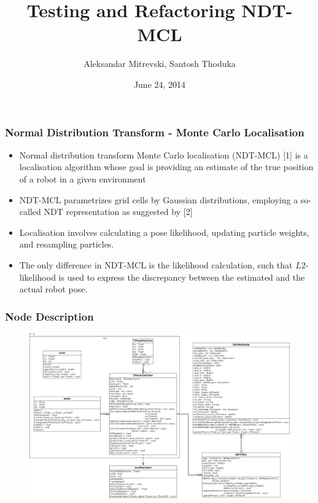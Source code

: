 \documentclass{beamer}
\title[Testing and Refactoring NDT-MCL]{Testing and Refactoring NDT-MCL} %
\author{Aleksandar Mitrevski, Santosh Thoduka} %
\institute[BRSU] %
{
Hochschule Bonn Rhein Sieg \\ %
\medskip
\textit{aleksandar.mitrevski@smail.inf.h-brs.de\\santosh.thoduka@smail.inf.h-brs.de} 
}
\date{June 24, 2014} %
\newenvironment{changemargin}[2]{%
  \begin{list}{}{%
    \setlength{\topsep}{0pt}%
    \setlength{\leftmargin}{#1}%
    \setlength{\rightmargin}{#2}%
    \setlength{\listparindent}{\parindent}%
    \setlength{\itemindent}{\parindent}%
    \setlength{\parsep}{\parskip}%
  }%
  \item[]}{\end{list}}
\begin{document}

\begin{frame}
\titlepage %
\end{frame}


\begin{frame}
\frametitle{Normal Distribution Transform - Monte Carlo Localisation}
\begin{itemize}
\item Normal distribution transform Monte Carlo localisation (NDT-MCL) [1] is a localisation algorithm whose goal is providing an estimate of the true position of a robot in a given environment
\item NDT-MCL parametrizes grid cells by Gaussian distributions, employing a so-called NDT representation as suggested by [2]
\item Localisation involves calculating a pose likelihood, updating particle weights, and resampling particles. 
\item The only difference in NDT-MCL is the likelihood calculation, such that $L2$-likelihood is used to express the discrepancy between the estimated and the actual robot pose.
\end{itemize}

\end{frame}

\begin{frame}
\frametitle{Node Description}
\begin{changemargin}{-1cm}{-1cm}
	\begin{figure}
    \includegraphics[height=0.74\textwidth]{ndtmcl.png}    
    \end{figure}
\end{changemargin}
\end{frame}
\end{document}
